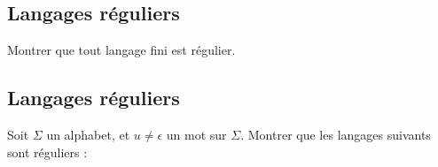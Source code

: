 \documentclass[a4paper,french,bookmarks]{book}
\begin{document}
    \subsection{Langages réguliers}
    
    Montrer que tout langage fini est régulier.
    
    
    \subsection{Langages réguliers}
    
    Soit $\Sigma$ un alphabet, et $u \neq \epsilon$ un mot sur $\Sigma$. Montrer que les langages suivants sont réguliers :
    
\end{document}
